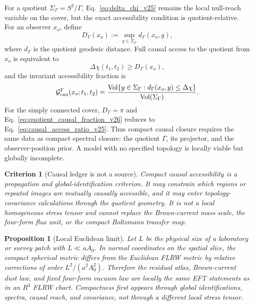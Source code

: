 \documentclass[
  aps,
  prd,
  reprint,
  superscriptaddress,
  floatfix,
  nofootinbib,
  longbibliography
]{revtex4-2}
\theoremstyle{plain}
\newtheorem{proposition}[theorem]{Proposition}
\newtheorem{criterion}[theorem]{Criterion}
\theoremstyle{definition}
\theoremstyle{remark}
\DeclareMathOperator{\Vol}{Vol}
\begin{document}
For a quotient \(\Sigma_\Gamma=S^3/\Gamma\), Eq.~\eqref{eq:delta_chi_v25}
remains the local null-reach variable on the cover, but the exact accessibility
condition is quotient-relative.  For an observer \(x_o\), define
\begin{equation}
D_\Gamma(x_o):=\sup_{y\in\Sigma_\Gamma}d_\Gamma(x_o,y),
\label{eq:quotient_causal_radius_v26}
\end{equation}
where \(d_\Gamma\) is the quotient geodesic distance.  Full causal access to the
quotient from \(x_o\) is equivalent to
\begin{equation}
\Delta\chi(t_1,t_2)\ge D_\Gamma(x_o),
\label{eq:quotient_full_access_v26}
\end{equation}
and the invariant accessibility fraction is
\begin{equation}
\mathcal G^\Gamma_{\rm cau}(x_o;t_1,t_2)
=
\frac{\Vol\{y\in\Sigma_\Gamma:d_\Gamma(x_o,y)\le\Delta\chi\}}
{\Vol(\Sigma_\Gamma)} .
\label{eq:quotient_causal_fraction_v26}
\end{equation}
For the simply connected cover, \(D_\Gamma=\pi\) and
Eq.~\eqref{eq:quotient_causal_fraction_v26} reduces to
Eq.~\eqref{eq:causal_access_ratio_v25}.  Thus compact causal closure requires
the same data as compact spectral closure: the quotient \(\Gamma\), its
projector, and the observer-position prior.  A model with no specified topology
is locally viable but globally incomplete.

\begin{criterion}[Causal ledger is not a source]
Compact causal accessibility is a propagation and global-identification
criterion.  It may constrain which regions or repeated images are mutually
causally accessible, and it may enter topology-covariance calculations through
the quotient geometry.  It is not a local homogeneous stress tensor and cannot
replace the Brown-current mass scale, the four-form flux unit, or the compact
Boltzmann transfer map.
\end{criterion}

\begin{proposition}[Local Euclidean limit]
Let \(L\) be the physical size of a laboratory or survey patch with
\(L\ll aA_0\).  In normal coordinates on the spatial slice, the compact
spherical metric differs from the Euclidean FLRW metric by relative corrections
of order \(L^2/(a^2A_0^2)\).  Therefore the residual atlas, Brown-current dust
law, and fixed four-form vacuum law are locally the same EFT statements as in an
\(R^3\) FLRW chart.  Compactness first appears through global identifications,
spectra, causal reach, and covariance, not through a different local stress
tensor.
\end{proposition}
\end{document}
